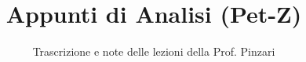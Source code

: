 \documentclass[a4paper,12pt]{article}
\title{Appunti di Analisi (Pet-Z)}
\author{Trascrizione e note delle lezioni della Prof. Pinzari}
\date{}
\begin{document}
\maketitle
\projectintro
\tableofcontents
\newpage

\end{document}

